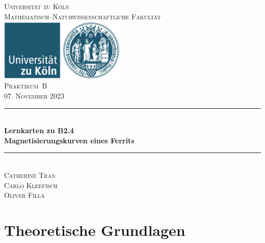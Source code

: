 \documentclass[12pt,a4paper]{scrartcl}
\numberwithin{equation}{section} %
\newcommand{\HRule}{\rule{\linewidth}{0.7mm}}
\begin{document}
\begin{titlepage}
	\pagestyle{empty}

	\begin{center}

	\textsc{\LARGE Universität zu Köln }\\ [0.4cm]
	\textsc{Mathematisch--Naturwissenschaftliche Fakultät} \\[1.5cm]

	\includegraphics[width=0.45\textwidth]{../media/uni.jpg}\\[1.5cm]  %

	\textsc{\Large Praktikum~B}\\[2mm]
	\textsc{07. November 2023}\\[10mm]
	\HRule \\[0.4cm]

		{	\Huge \bfseries Lernkarten zu B2.4}\\[0.4cm]
			{	\huge \bfseries Magnetisierungskurven eines Ferrits}\\[0.3cm]
	
	\HRule \\[3cm]

			\textsc{\Large Catherine Tran } \\[3pt]
		\textsc{\Large Carlo Kleefisch } \\[3pt]
		\textsc{\Large Oliver Filla } \\[3pt]
		
	\end{center}
\end{titlepage}

\newpage
\tableofcontents
\newpage

\hypertarget{theoretische-grundlagen}{%
\section{Theoretische Grundlagen}\label{theoretische-grundlagen}}
\end{document}
